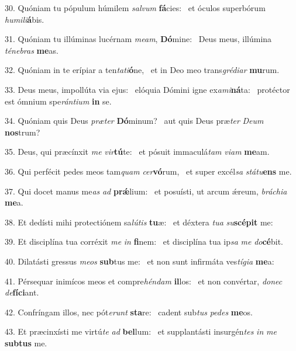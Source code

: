 30. Quóniam tu pópulum húmilem \textit{sal}\textit{vum} \textbf{fá}cies: \ast\  et óculos superbórum \textit{hu}\textit{mi}\textit{li}\textbf{á}bis.\

31. Quóniam tu illúminas lucérnam \textit{me}\textit{am}, \textbf{Dó}mine: \ast\  Deus meus, illúmina \textit{té}\textit{ne}\textit{bras} \textbf{me}as.\

32. Quóniam in te erípiar a ten\textit{ta}\textit{ti}\textbf{ó}ne, \ast\  et in Deo meo trans\textit{gré}\textit{di}\textit{ar} \textbf{mu}rum.\

33. Deus meus, impollúta via ejus: \dag\  elóquia Dómini igne ex\textit{a}\textit{mi}\textbf{ná}ta: \ast\  protéctor est ómnium spe\textit{rán}\textit{ti}\textit{um} \textbf{in} se.\

34. Quóniam quis Deus \textit{præ}\textit{ter} \textbf{Dó}minum? \ast\  aut quis Deus præ\textit{ter} \textit{De}\textit{um} \textbf{nos}trum?\

35. Deus, qui præcínxit \textit{me} \textit{vir}\textbf{tú}te: \ast\  et pósuit immaculá\textit{tam} \textit{vi}\textit{am} \textbf{me}am.\

36. Qui perfécit pedes meos tam\textit{quam} \textit{cer}\textbf{vó}rum, \ast\  et super excél\textit{sa} \textit{stá}\textit{tu}\textbf{ens} me.\

37. Qui docet manus me\textit{as} \textit{ad} \textbf{prǽ}lium: \ast\  et posuísti, ut arcum ǽreum, \textit{brá}\textit{chi}\textit{a} \textbf{me}a.\

38. Et dedísti mihi protectiónem sa\textit{lú}\textit{tis} \textbf{tu}æ: \ast\  et déxtera \textit{tu}\textit{a} \textit{su}\textbf{scé}\textbf{pit} me:\

39. Et disciplína tua corréxit \textit{me} \textit{in} \textbf{fi}nem: \ast\  et disciplína tua ip\textit{sa} \textit{me} \textit{do}\textbf{cé}bit.\

40. Dilatásti gressus \textit{me}\textit{os} \textbf{sub}tus me: \ast\  et non sunt infirmáta ves\textit{tí}\textit{gi}\textit{a} \textbf{me}a:\

41. Pérsequar inimícos meos et compre\textit{hén}\textit{dam} \textbf{il}los: \ast\  et non convértar, \textit{do}\textit{nec} \textit{de}\textbf{fí}\textbf{ci}ant.\

42. Confríngam illos, nec pót\textit{e}\textit{runt} \textbf{sta}re: \ast\  cadent sub\textit{tus} \textit{pe}\textit{des} \textbf{me}os.\

43. Et præcinxísti me virtú\textit{te} \textit{ad} \textbf{bel}lum: \ast\  et supplantásti insurgén\textit{tes} \textit{in} \textit{me} \textbf{sub}\textbf{tus} me.\

